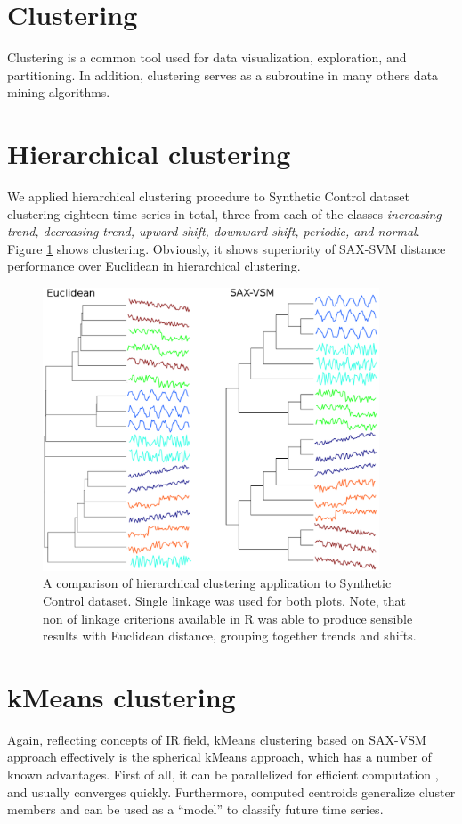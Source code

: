 \documentclass{llncs}
\begin{document}
\section{Clustering}
Clustering is a common tool used for data visualization, exploration, and partitioning. 
In addition, clustering serves as a subroutine in many others data mining algorithms.

\section{Hierarchical clustering}
We applied hierarchical clustering procedure to Synthetic Control dataset clustering eighteen
time series in total, three from each of the classes \textit{increasing trend, decreasing trend,
upward shift, downward shift, periodic, and normal}. Figure \ref{fig:hc} shows
clustering. Obviously, it shows superiority of SAX-SVM distance performance over Euclidean in
hierarchical clustering.

\begin{figure}[tbp]
   \centering
   \includegraphics[width=100mm]{figures/clustering.eps}
   \caption{A comparison of hierarchical clustering application to Synthetic Control dataset.
   Single linkage was used for both plots. Note, that non of linkage criterions available in R
   was able to produce sensible results with Euclidean distance, grouping together trends
and shifts.
   }
   \label{fig:hc}
\end{figure}

\section{kMeans clustering}
Again, reflecting concepts of IR field, kMeans clustering based on SAX-VSM approach effectively
is the spherical kMeans approach, which has a number of known advantages. First of all, it can be
parallelized for efficient computation \cite{modha}, and usually converges quickly. Furthermore,
computed centroids generalize cluster members and can be used as a ``model'' to classify future 
time series.
\end{document}
